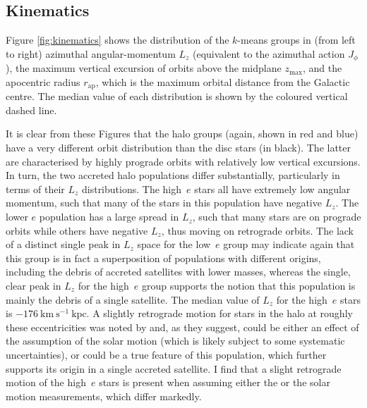 \subsection{Kinematics}

Figure \ref{fig:kinematics} shows the distribution of the $k$-means
groups in (from left to right) azimuthal angular-momentum $L_z$
(equivalent to the azimuthal action $J_\phi$), the maximum vertical
excursion of orbits above the midplane $z_\mathrm{max}$, and the
apocentric radius $r_\mathrm{ap}$, which is the maximum orbital
distance from the Galactic centre. The median value of each
distribution is shown by the coloured vertical dashed line. 

It is clear from these Figures that the halo groups (again,
shown in red and blue) have a very different orbit distribution
than the disc stars (in black).  The latter are characterised by
highly prograde orbits with relatively low vertical excursions.  In
turn, the two accreted halo populations differ substantially,
particularly in terms of their $L_z$ distributions. The high~$e$
stars all have extremely low angular momentum, such that many of
the stars in this population have negative $L_z$. The lower $e$
population has a large spread in $L_z$, such that many stars are
on prograde orbits while others have negative $L_z$, thus moving
on retrograde orbits. The lack of a distinct single peak in $L_z$
space for the low~$e$ group may indicate again that this group is
in fact a superposition of populations with different origins,
including the debris of accreted satellites with lower masses, whereas
the single, clear peak in $L_z$ for the high~$e$ group supports the
notion that this population is mainly the debris of a single
satellite. The median value of $L_z$ for the high~$e$ stars is $-176
\mathrm{\ km\ s^{-1}\ kpc}$.  A slightly retrograde motion for stars
in the halo at roughly these eccentricities was noted by
\citet{2018arXiv180606038H} and, as they suggest, could be either
an effect of the assumption of the solar motion (which is likely
subject to some systematic uncertainties), or could be a true feature
of this population, which further supports its origin in a single
accreted satellite. I find that a slight retrograde motion of the
high~$e$ stars is present when assuming either the
\citet{2010MNRAS.403.1829S} or the \citet{2005ApJ...629..268H} solar
motion measurements, which differ markedly.


